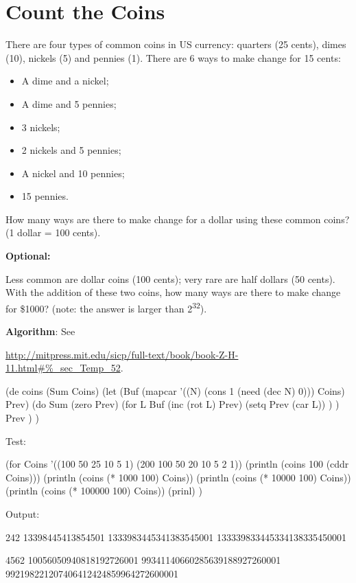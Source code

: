 \pagebreak{}
\section*{Count the Coins}


There are four types of common coins in US currency: quarters (25
cents), dimes (10), nickels (5) and pennies (1). There are 6 ways to
make change for 15 cents:

\begin{itemize}
\item
  A dime and a nickel;
\item
  A dime and 5 pennies;
\item
  3 nickels;
\item
  2 nickels and 5 pennies;
\item
  A nickel and 10 pennies;
\item
  15 pennies.
\end{itemize}

How many ways are there to make change for a dollar using these common
coins? (1 dollar = 100 cents).

\textbf{Optional:}

Less common are dollar coins (100 cents); very rare are half dollars (50
cents). With the addition of these two coins, how many ways are there to
make change for \$1000? (note: the answer is larger than
2\textsuperscript{32}).

\textbf{Algorithm}: See

\href{http://mitpress.mit.edu/sicp/full-text/book/book-Z-H-11.html\#\%\_sec\_Temp\_52}{http://mitpress.mit.edu/sicp/full-text/book/book-Z-H-11.html\#\%\_sec\_Temp\_52}.


\begin{wideverbatim}

(de coins (Sum Coins)
   (let (Buf (mapcar '((N) (cons 1 (need (dec N) 0))) Coins)  Prev)
      (do Sum
         (zero Prev)
         (for L Buf
            (inc (rot L) Prev)
            (setq Prev (car L)) ) )
      Prev ) )

Test:

(for Coins '((100 50 25 10 5 1) (200 100 50 20 10 5 2 1))
   (println (coins 100 (cddr Coins)))
   (println (coins (* 1000 100) Coins))
   (println (coins (* 10000 100) Coins))
   (println (coins (* 100000 100) Coins))
   (prinl) )

Output:

242
13398445413854501
1333983445341383545001
133339833445334138335450001

4562
10056050940818192726001
99341140660285639188927260001
992198221207406412424859964272600001

\end{wideverbatim}

